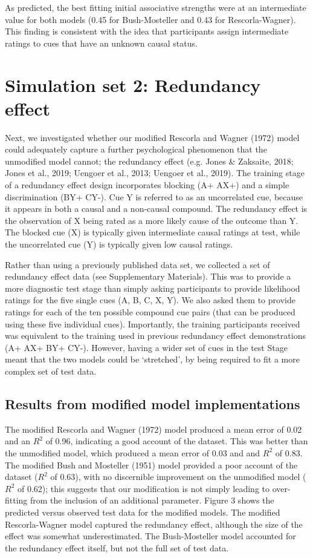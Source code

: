 \documentclass[twocolumn]{article}
\begin{document}
As predicted, the best fitting initial associative strengths were at an
intermediate value for both models (0.45 for Bush-Mosteller and 0.43 for
Rescorla-Wagner). This finding is consistent with the idea that
participants assign intermediate ratings to cues that have an unknown
causal status.

\section{Simulation set 2: Redundancy effect}

Next, we investigated whether our modified Rescorla and Wagner (1972)
model could adequately capture a further psychological phenomenon that
the unmodified model cannot; the redundancy effect (e.g. Jones \&
Zaksaite, 2018; Jones et al., 2019; Uengoer et al., 2013; Uengoer et
al., 2019). The training stage of a redundancy effect design
incorporates blocking (A+ AX+) and a simple discrimination (BY+ CY-).
Cue Y is referred to as an uncorrelated cue, because it appears in both
a causal and a non-causal compound. The redundancy effect is the
observation of X being rated as a more likely cause of the outcome than
Y. The blocked cue (X) is typically given intermediate causal ratings at
test, while the uncorrelated cue (Y) is typically given low causal
ratings.

Rather than using a previously published data set, we collected a set of
redundancy effect data (see Supplementary Materials). This was to
provide a more diagnostic test stage than simply asking participants to
provide likelihood ratings for the five single cues (A, B, C, X, Y). We
also asked them to provide ratings for each of the ten possible compound
cue pairs (that can be produced using these five individual cues).
Importantly, the training participants received was equivalent to the
training used in previous redundancy effect demonstrations (A+ AX+ BY+
CY-). However, having a wider set of cues in the test Stage meant that
the two models could be `stretched', by being required to fit a more
complex set of test data.

\subsection{Results from modified model implementations}

The modified Rescorla and Wagner (1972) model produced a mean error of
0.02 and an $R^2$ of 0.96, indicating a good account of
the dataset. This was better than the unmodified model, which produced a
mean error of 0.03 and and $R^2$ of 0.83. The modified
Bush and Mosteller (1951) model provided a poor account of the dataset
($R^2$ of 0.63), with no discernible improvement on the
unmodified model ($R^2$ of 0.62); this suggests that our
modification is not simply leading to over-fitting from the inclusion of
an additional parameter. Figure 3 shows the predicted versus observed
test data for the modified models. The modified Rescorla-Wagner model
captured the redundancy effect, although the size of the effect was
somewhat underestimated. The Bush-Mosteller model accounted for the
redundancy effect itself, but not the full set of test data.
\end{document}
